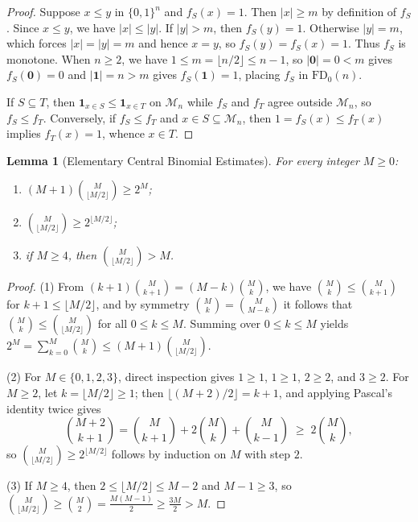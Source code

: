\documentclass[11pt]{article}
\newtheorem{lemma}[theorem]{Lemma}
\theoremstyle{definition}
\newcommand{\FDz}{\mathrm{FD}_0}
\begin{document}
\begin{proof}
Suppose $x \le y$ in $\{0,1\}^n$ and $f_S(x) = 1$. Then $|x| \ge m$ by definition of $f_S$. Since $x \le y$, we have $|x| \le |y|$. If $|y| > m$, then $f_S(y) = 1$. Otherwise $|y| = m$, which forces $|x| = |y| = m$ and hence $x = y$, so $f_S(y) = f_S(x) = 1$. Thus $f_S$ is monotone. When $n \ge 2$, we have $1 \le m = \lfloor n/2 \rfloor \le n - 1$, so $|\mathbf{0}| = 0 < m$ gives $f_S(\mathbf{0}) = 0$ and $|\mathbf{1}| = n > m$ gives $f_S(\mathbf{1}) = 1$, placing $f_S$ in $\FDz(n)$.

If $S \subseteq T$, then $\mathbf{1}_{x \in S} \le \mathbf{1}_{x \in T}$ on $\mathcal{M}_n$ while $f_S$ and $f_T$ agree outside $\mathcal{M}_n$, so $f_S \le f_T$. Conversely, if $f_S \le f_T$ and $x \in S \subseteq \mathcal{M}_n$, then $1 = f_S(x) \le f_T(x)$ implies $f_T(x) = 1$, whence $x \in T$.
\end{proof}

\begin{lemma}[Elementary Central Binomial Estimates]\label{lem:binom-est}
For every integer $M \ge 0$:
\begin{enumerate}
  \item $(M + 1)\binom{M}{\lfloor M/2 \rfloor} \ge 2^M$;
  \item $\binom{M}{\lfloor M/2 \rfloor} \ge 2^{\lfloor M/2 \rfloor}$;
  \item if $M \ge 4$, then $\binom{M}{\lfloor M/2 \rfloor} > M$.
\end{enumerate}
\end{lemma}

\begin{proof}
(1) From $(k + 1)\binom{M}{k + 1} = (M - k)\binom{M}{k}$, we have $\binom{M}{k} \le \binom{M}{k + 1}$ for $k + 1 \le \lfloor M/2 \rfloor$, and by symmetry $\binom{M}{k} = \binom{M}{M - k}$ it follows that $\binom{M}{k} \le \binom{M}{\lfloor M/2 \rfloor}$ for all $0 \le k \le M$. Summing over $0 \le k \le M$ yields $2^M = \sum_{k=0}^M \binom{M}{k} \le (M + 1)\binom{M}{\lfloor M/2 \rfloor}$.

(2) For $M \in \{0, 1, 2, 3\}$, direct inspection gives $1 \ge 1$, $1 \ge 1$, $2 \ge 2$, and $3 \ge 2$. For $M \ge 2$, let $k = \lfloor M/2 \rfloor \ge 1$; then $\lfloor (M + 2)/2 \rfloor = k + 1$, and applying Pascal's identity twice gives
\[
  \binom{M + 2}{k + 1} = \binom{M}{k + 1} + 2\binom{M}{k} + \binom{M}{k - 1} \;\ge\; 2\binom{M}{k},
\]
so $\binom{M}{\lfloor M/2 \rfloor} \ge 2^{\lfloor M/2 \rfloor}$ follows by induction on $M$ with step $2$.

(3) If $M \ge 4$, then $2 \le \lfloor M/2 \rfloor \le M - 2$ and $M - 1 \ge 3$, so $\binom{M}{\lfloor M/2 \rfloor} \ge \binom{M}{2} = \frac{M(M - 1)}{2} \ge \frac{3M}{2} > M$.
\end{proof}
\end{document}
